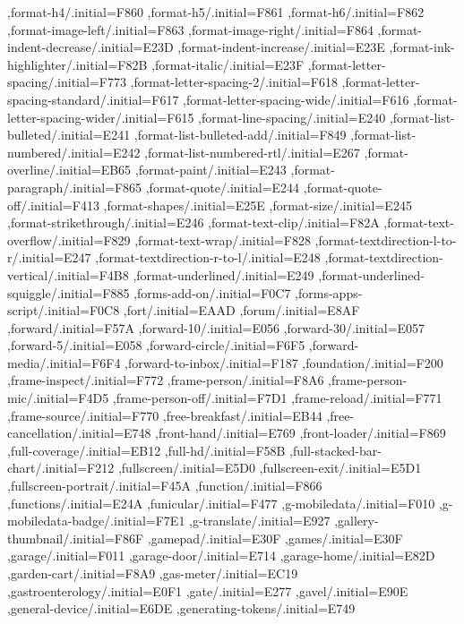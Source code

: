 { ,format-h4/.initial=F860
 ,format-h5/.initial=F861
 ,format-h6/.initial=F862
 ,format-image-left/.initial=F863
 ,format-image-right/.initial=F864
 ,format-indent-decrease/.initial=E23D
 ,format-indent-increase/.initial=E23E
 ,format-ink-highlighter/.initial=F82B
 ,format-italic/.initial=E23F
 ,format-letter-spacing/.initial=F773
 ,format-letter-spacing-2/.initial=F618
 ,format-letter-spacing-standard/.initial=F617
 ,format-letter-spacing-wide/.initial=F616
 ,format-letter-spacing-wider/.initial=F615
 ,format-line-spacing/.initial=E240
 ,format-list-bulleted/.initial=E241
 ,format-list-bulleted-add/.initial=F849
 ,format-list-numbered/.initial=E242
 ,format-list-numbered-rtl/.initial=E267
 ,format-overline/.initial=EB65
 ,format-paint/.initial=E243
 ,format-paragraph/.initial=F865
 ,format-quote/.initial=E244
 ,format-quote-off/.initial=F413
 ,format-shapes/.initial=E25E
 ,format-size/.initial=E245
 ,format-strikethrough/.initial=E246
 ,format-text-clip/.initial=F82A
 ,format-text-overflow/.initial=F829
 ,format-text-wrap/.initial=F828
 ,format-textdirection-l-to-r/.initial=E247
 ,format-textdirection-r-to-l/.initial=E248
 ,format-textdirection-vertical/.initial=F4B8
 ,format-underlined/.initial=E249
 ,format-underlined-squiggle/.initial=F885
 ,forms-add-on/.initial=F0C7
 ,forms-apps-script/.initial=F0C8
 ,fort/.initial=EAAD
 ,forum/.initial=E8AF
 ,forward/.initial=F57A
 ,forward-10/.initial=E056
 ,forward-30/.initial=E057
 ,forward-5/.initial=E058
 ,forward-circle/.initial=F6F5
 ,forward-media/.initial=F6F4
 ,forward-to-inbox/.initial=F187
 ,foundation/.initial=F200
 ,frame-inspect/.initial=F772
 ,frame-person/.initial=F8A6
 ,frame-person-mic/.initial=F4D5
 ,frame-person-off/.initial=F7D1
 ,frame-reload/.initial=F771
 ,frame-source/.initial=F770
 ,free-breakfast/.initial=EB44
 ,free-cancellation/.initial=E748
 ,front-hand/.initial=E769
 ,front-loader/.initial=F869
 ,full-coverage/.initial=EB12
 ,full-hd/.initial=F58B
 ,full-stacked-bar-chart/.initial=F212
 ,fullscreen/.initial=E5D0
 ,fullscreen-exit/.initial=E5D1
 ,fullscreen-portrait/.initial=F45A
 ,function/.initial=F866
 ,functions/.initial=E24A
 ,funicular/.initial=F477
 ,g-mobiledata/.initial=F010
 ,g-mobiledata-badge/.initial=F7E1
 ,g-translate/.initial=E927
 ,gallery-thumbnail/.initial=F86F
 ,gamepad/.initial=E30F
 ,games/.initial=E30F
 ,garage/.initial=F011
 ,garage-door/.initial=E714
 ,garage-home/.initial=E82D
 ,garden-cart/.initial=F8A9
 ,gas-meter/.initial=EC19
 ,gastroenterology/.initial=E0F1
 ,gate/.initial=E277
 ,gavel/.initial=E90E
 ,general-device/.initial=E6DE
 ,generating-tokens/.initial=E749
}
